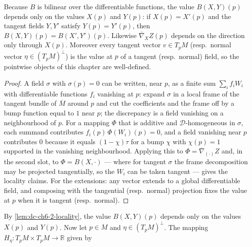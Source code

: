 \begin{lemma}
  \label{lem:dc-ch6-2-locality}
  \leanok
  Because $B$ is bilinear over the differentiable functions, the value
  $B(X,Y)(p)$ depends only on the values $X(p)$ and $Y(p)$: if $X(p)=X'(p)$ and
  the tangent fields $Y,Y'$ satisfy $Y(p)=Y'(p)$, then
  $B(X,Y)(p)=B(X',Y')(p)$. Likewise $\overline{\nabla}_XZ(p)$ depends on the
  direction only through $X(p)$. Moreover every tangent vector $v\in T_pM$
  (resp.\ normal vector $\eta\in(T_pM)^\perp$) is the value at $p$ of a tangent
  (resp.\ normal) field, so the pointwise objects of this chapter are
  well-defined.
\end{lemma}
\begin{proof}
  \leanok
  A field $\sigma$ with $\sigma(p)=0$ can be written, near $p$, as a finite sum
  $\sum_i f_i W_i$ with differentiable functions $f_i$ vanishing at $p$: expand
  $\sigma$ in a local frame of the tangent bundle of $\overline{M}$ around $p$
  and cut the coefficients and the frame off by a bump function equal to $1$
  near $p$; the discrepancy is a field vanishing on a neighbourhood of $p$.
  For a mapping $\Phi$ that is additive and $\mathcal{D}$-homogeneous in
  $\sigma$, each summand contributes $f_i(p)\,\Phi(W_i)(p)=0$, and a field
  vanishing near $p$ contributes $0$ because it equals $(1-\chi)\tau$ for a
  bump $\chi$ with $\chi(p)=1$ supported in the vanishing neighbourhood.
  Applying this to $\Phi=\overline{\nabla}_{(\cdot)}Z$ and, in the second slot,
  to $\Phi=B(X,\cdot)$ — where for tangent $\sigma$ the frame decomposition
  may be projected tangentially, so the $W_i$ can be taken tangent — gives the
  locality claims. For the extensions: any vector extends to a global
  differentiable field, and composing with the tangential (resp.\ normal)
  projection fixes the value at $p$ when it is tangent (resp.\ normal).
\end{proof}

By \cref{lem:dc-ch6-2-locality}, the value $B(X,Y)(p)$ depends only on the
values $X(p)$ and $Y(p)$. Now let $p\in M$ and $\eta\in(T_pM)^\perp$. The
mapping $H_\eta:T_pM\times T_pM\to\mathbb{R}$ given by

